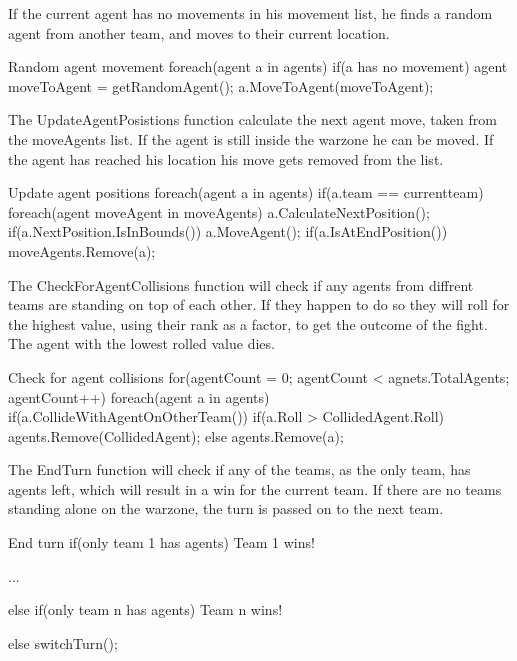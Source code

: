 If the current agent has no movements in his movement list, he finds a random agent from another team, and moves to their current location.
\begin{source}{Random agent movement}{}
foreach(agent a in agents)
{
	if(a has no movement)
	{
		agent moveToAgent = getRandomAgent();
		a.MoveToAgent(moveToAgent);
	}
}
\end{source}

The UpdateAgentPosistions function calculate the next agent move, taken from the moveAgents list. If the agent is still inside the warzone he can be moved. If the agent has reached his location his move gets removed from the list.
\begin{source}{Update agent positions}{}
foreach(agent a in agents)
{
	if(a.team == currentteam)
	{
		foreach(agent moveAgent in moveAgents)
		{
			a.CalculateNextPosition();
			if(a.NextPosition.IsInBounds())
			{
				a.MoveAgent();
			}
			if(a.IsAtEndPosition())
			{
				moveAgents.Remove(a);
			}
		}
	}
}
\end{source}

The CheckForAgentCollisions function will check if any agents from diffrent teams are standing on top of each other. If they happen to do so they will roll for the highest value, using their rank as a factor, to get the outcome of the fight. The agent with the lowest rolled value dies.
\begin{source}{Check for agent collisions}{}
for(agentCount = 0; agentCount < agnets.TotalAgents; agentCount++)
{
	foreach(agent a in agents)
	{
		if(a.CollideWithAgentOnOtherTeam())
		{
			if(a.Roll > CollidedAgent.Roll)
			{
				agents.Remove(CollidedAgent);
			}
			else
			{
				agents.Remove(a);
			}
		}
	}
}
\end{source}

The EndTurn function will check if any of the teams, as the only team, has agents left, which will result in a win for the current team. If there are no teams standing alone on the warzone, the turn is passed on to the next team.
\begin{source}{End turn}{}
if(only team 1 has agents)
{
	Team 1 wins!
}

...

else if(only team n has agents)
{
	Team n wins!
}

else
{
	switchTurn();
}
\end{source}